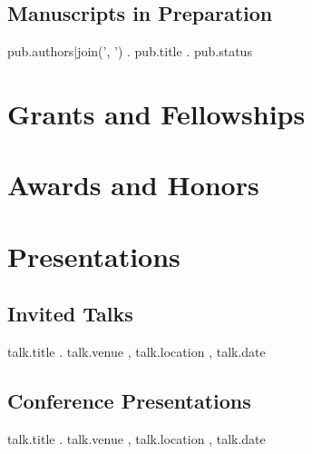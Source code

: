 \documentclass[11pt,letterpaper]{article}
\begin{document}
{{{{{{{{{{\subsection*{Manuscripts in Preparation}
{%
\begin{list3}
\item { {{pub.authors|join(', ')}} }. { {{pub.title}} }. { {{pub.status}} }
\end{list3}
{%

\section*{Grants and Fellowships}
{%
{%

\section*{Awards and Honors}
{%
{%

\section*{Presentations}
\subsection*{Invited Talks}
{%
\begin{list3}
\item { {{talk.title}} }. { {{talk.venue}} }, { {{talk.location}} }, { {{talk.date}} }
\end{list3}
{%

\subsection*{Conference Presentations}
{%
\begin{list3}
\item { {{talk.title}} }. { {{talk.venue}} }, { {{talk.location}} }, { {{talk.date}} }
\end{list3}
{%

}}}}}}}}}}}}}}}}}}}}
\end{document}
